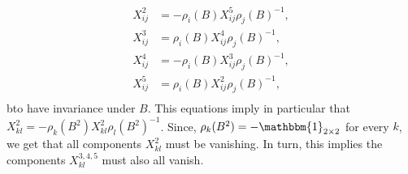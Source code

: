             \begin{align}
                X^2_{ij}&=-\rho_i(B)X^5_{ij}\rho_j(B)^{-1},\\
                X^3_{ij}&=\rho_i(B)X^4_{ij}\rho_j(B)^{-1},\\
                X^4_{ij}&=-\rho_i(B)X^3_{ij}\rho_j(B)^{-1},\\
                X^5_{ij}&=\rho_i(B)X^2_{ij}\rho_j(B)^{-1},\\
            \end{align}
            bto have invariance under $B$. This equations imply in particular that $X^2_{kl}=-\rho_k(B^2)X^2_{kl}\rho_l(B^2)^{-1}$. Since, $\rho_k(B^2)=-\mathbbm{1}_{2\times 2}$ for every $k$, we get that all components $X^2_{kl}$ must be vanishing. In turn, this implies the components $X^{3,4,5}_{kl}$ must also all vanish. 


    \subsection{}\label{app:compsum}

